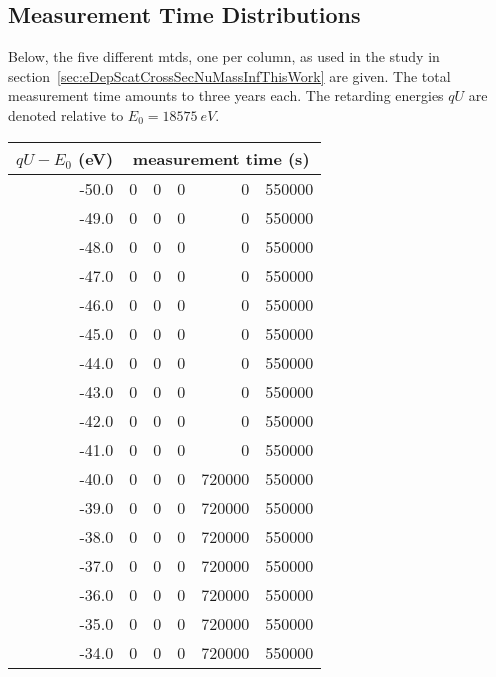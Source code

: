 \begin{samepage}
\section{Measurement Time Distributions}
\label{sec:appendixEDepScatCrossSecMTDs}
Below, the five different \gls{mtd}s, one per column, as used in the study in section~\ref{sec:eDepScatCrossSecNuMassInfThisWork} are given. The total measurement time amounts to three years each. The retarding energies $qU$ are denoted relative to $E_0=\SI{18575}{eV}$.\\[10pt]
\begin{center}
{\scriptsize
\centering
\begin{tabular}{rrrrrr}
	\toprule
	$qU-E_0$ (eV) & \multicolumn{5}{c}{measurement time (s)} \\
	\hline
	-50.0 &        0 &        0 &        0 &        0 &   550000 \\
	-49.0 &        0 &        0 &        0 &        0 &   550000 \\
	-48.0 &        0 &        0 &        0 &        0 &   550000 \\
	-47.0 &        0 &        0 &        0 &        0 &   550000 \\
	-46.0 &        0 &        0 &        0 &        0 &   550000 \\
	-45.0 &        0 &        0 &        0 &        0 &   550000 \\
	-44.0 &        0 &        0 &        0 &        0 &   550000 \\
	-43.0 &        0 &        0 &        0 &        0 &   550000 \\
	-42.0 &        0 &        0 &        0 &        0 &   550000 \\
	-41.0 &        0 &        0 &        0 &        0 &   550000 \\
	-40.0 &        0 &        0 &        0 &   720000 &   550000 \\
	-39.0 &        0 &        0 &        0 &   720000 &   550000 \\
	-38.0 &        0 &        0 &        0 &   720000 &   550000 \\
	-37.0 &        0 &        0 &        0 &   720000 &   550000 \\
	-36.0 &        0 &        0 &        0 &   720000 &   550000 \\
	-35.0 &        0 &        0 &        0 &   720000 &   550000 \\
	-34.0 &        0 &        0 &        0 &   720000 &   550000 \\

\end{tabular}}
\end{center}
\end{samepage}
